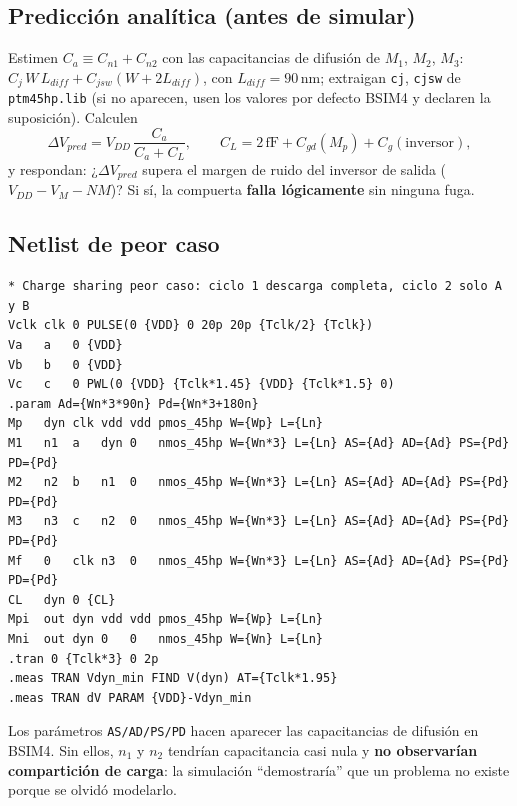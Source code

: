 \documentclass[11pt,a4paper]{article}
\begin{document}
\subsection{Predicción analítica (antes de simular)}
Estimen $C_a\equiv C_{n1}+C_{n2}$ con las capacitancias de difusión de $M_1$, $M_2$, $M_3$: $C_j\,W\,L_{diff}+C_{jsw}(W+2L_{diff})$, con $L_{diff}=90$\,nm; extraigan \texttt{cj}, \texttt{cjsw} de \texttt{ptm45hp.lib} (si no aparecen, usen los valores por defecto BSIM4 y declaren la suposición). Calculen
\[
\Delta V_{pred}=V_{DD}\,\frac{C_a}{C_a+C_L},\qquad C_L = 2\,\mathrm{fF}+C_{gd}(M_p)+C_g(\text{inversor}),
\]
y respondan: ¿$\Delta V_{pred}$ supera el margen de ruido del inversor de salida ($V_{DD}-V_M-NM$)? Si sí, la compuerta \textbf{falla lógicamente} sin ninguna fuga.

\subsection{Netlist de peor caso}
\begin{lstlisting}
* Charge sharing peor caso: ciclo 1 descarga completa, ciclo 2 solo A y B
Vclk clk 0 PULSE(0 {VDD} 0 20p 20p {Tclk/2} {Tclk})
Va   a   0 {VDD}
Vb   b   0 {VDD}
Vc   c   0 PWL(0 {VDD} {Tclk*1.45} {VDD} {Tclk*1.5} 0)
.param Ad={Wn*3*90n} Pd={Wn*3+180n}
Mp   dyn clk vdd vdd pmos_45hp W={Wp} L={Ln}
M1   n1  a   dyn 0   nmos_45hp W={Wn*3} L={Ln} AS={Ad} AD={Ad} PS={Pd} PD={Pd}
M2   n2  b   n1  0   nmos_45hp W={Wn*3} L={Ln} AS={Ad} AD={Ad} PS={Pd} PD={Pd}
M3   n3  c   n2  0   nmos_45hp W={Wn*3} L={Ln} AS={Ad} AD={Ad} PS={Pd} PD={Pd}
Mf   0   clk n3  0   nmos_45hp W={Wn*3} L={Ln} AS={Ad} AD={Ad} PS={Pd} PD={Pd}
CL   dyn 0 {CL}
Mpi  out dyn vdd vdd pmos_45hp W={Wp} L={Ln}
Mni  out dyn 0   0   nmos_45hp W={Wn} L={Ln}
.tran 0 {Tclk*3} 0 2p
.meas TRAN Vdyn_min FIND V(dyn) AT={Tclk*1.95}
.meas TRAN dV PARAM {VDD}-Vdyn_min
\end{lstlisting}
\begin{aviso}
Los parámetros \texttt{AS/AD/PS/PD} hacen aparecer las capacitancias de difusión en BSIM4. Sin ellos, $n_1$ y $n_2$ tendrían capacitancia casi nula y \textbf{no observarían compartición de carga}: la simulación ``demostraría'' que un problema no existe porque se olvidó modelarlo.
\end{aviso}
\end{document}
